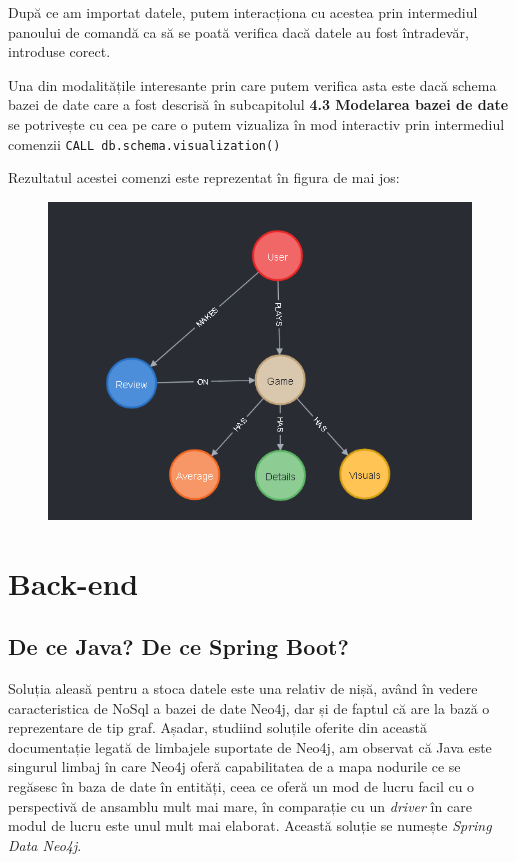 \documentclass[12pt,a4paper]{report}
\begin{document}
După ce am importat datele, putem interacționa cu acestea prin intermediul panoului de comandă ca să se poată verifica dacă datele au fost întradevăr, introduse corect.

Una din modalitățile interesante prin care putem verifica asta este dacă schema bazei de date care a fost descrisă în subcapitolul \textbf{4.3 Modelarea bazei de date } se potrivește cu cea pe care o putem vizualiza în mod interactiv prin intermediul comenzii \texttt{CALL db.schema.visualization()}

Rezultatul acestei comenzi este reprezentat în figura de mai jos:

\begin{figure}[H]
\centering
\caption{}
\includegraphics[scale = 0.7]{exemplu_16_schema}
\caption*{}
\end{figure}



\section{Back-end}

\subsection{De ce Java? De ce Spring Boot?}

Soluția aleasă pentru a stoca datele este una relativ de nișă, având în vedere caracteristica de NoSql a bazei de date Neo4j, dar și de faptul că are la bază o reprezentare de tip graf. Așadar, studiind soluțile oferite din această documentație \cite{20} legată de limbajele suportate de Neo4j, am observat că Java este singurul limbaj în care Neo4j oferă capabilitatea de a mapa nodurile ce se regăsesc în baza de date în entități, ceea ce oferă un mod de lucru facil cu o perspectivă de ansamblu mult mai mare, în comparație cu un \emph{driver} în care modul de lucru este unul mult mai elaborat. Această soluție se numește \emph{Spring Data Neo4j}. \cite{21}
\end{document}

